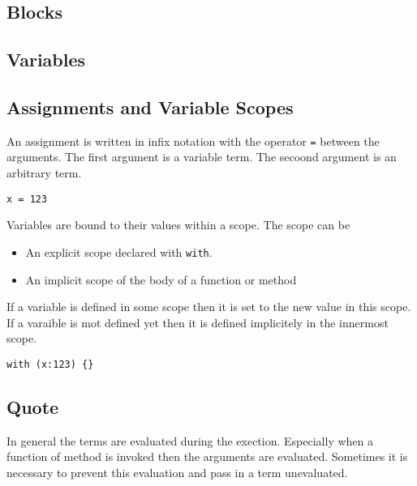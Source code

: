 \documentclass[11pt,a4paper]{scrbook}
\newcommand\keyword[1]{\texttt{#1}}
\begin{document}

\subsection{Blocks}


\subsection{Variables}


\subsection{Assignments and Variable Scopes}

An assignment is written in infix notation with the operator \keyword{=}
between the arguments. The first argument is a variable term. The secoond
argument is an arbitrary term.


\begin{lstlisting}[language=BibTool]
x = 123
\end{lstlisting}

Variables are bound to their values within a scope. The scope can be

\begin{itemize}
\item An explicit scope declared with \keyword{with}.
\item An implicit scope of the body of a function or method
\end{itemize}

If a variable is defined in some scope then it is set to the new value in this
scope. If a varaible is mot defined yet then it is defined implicitely in the
innermost scope.


\begin{lstlisting}[language=BibTool]
with (x:123) {}
\end{lstlisting}

\subsection{Quote}

In general the terms are evaluated during the exection. Especially when a
function of method is invoked then the arguments are evaluated. Sometimes it
is necessary to prevent this evaluation and pass in a term unevaluated.
\end{document}
